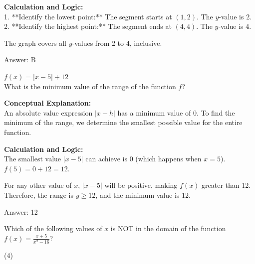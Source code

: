 \documentclass[11pt,paper=a4,answers]{exam}
\begin{document}
\begin{questions}
\begin{solution}
\vspace{30pt}

\textbf{Calculation and Logic:} \\
1. **Identify the lowest point:** The segment starts at $(1, 2)$. The $y$-value is 2. \\
2. **Identify the highest point:** The segment ends at $(4, 4)$. The $y$-value is 4.

\vspace{15pt}

The graph covers all $y$-values from 2 to 4, inclusive.

\vspace{30pt}

Answer: \colorbox{yellow!100}{B}
\end{solution}

\vspace{40pt}

\question
$f(x) = |x - 5| + 12$ \\
What is the minimum value of the range of the function $f$?

\begin{solution}
\textbf{Conceptual Explanation:} \\
An absolute value expression $|x - h|$ has a minimum value of 0. To find the minimum of the range, we determine the smallest possible value for the entire function.

\vspace{30pt}

\textbf{Calculation and Logic:} \\
The smallest value $|x - 5|$ can achieve is 0 (which happens when $x = 5$). \\
$f(5) = 0 + 12 = 12$.

\vspace{15pt}

For any other value of $x$, $|x - 5|$ will be positive, making $f(x)$ greater than 12. \\
Therefore, the range is $y \geq 12$, and the minimum value is 12.

\vspace{30pt}

Answer: \colorbox{yellow!100}{12}
\end{solution}

\vspace{40pt}

\question
Which of the following values of $x$ is NOT in the domain of the function $f(x) = \frac{x+5}{x^2 - 16}$?
\begin{tasks}(4)
\end{tasks}


\end{questions}
\end{document}
